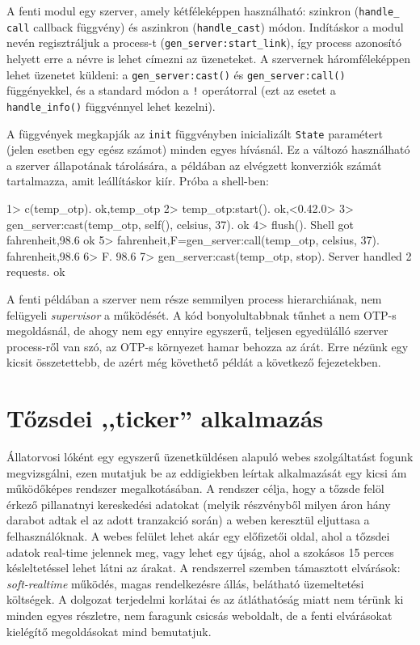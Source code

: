 \documentclass[12pt, a4paper, oneside]{book}
\begin{document}
A fenti modul egy szerver, amely kétféleképpen használható: szinkron
(\texttt{handle\_ call} callback függvény) és aszinkron (\texttt{handle\_cast})
módon. Indításkor a modul nevén regisztráljuk a process-t
(\texttt{gen\_server:start\_link}), így process azonosító helyett erre a névre
is lehet címezni az üzeneteket. A szervernek háromféleképpen lehet üzenetet
küldeni: a \texttt{gen\_server:cast()} és \texttt{gen\_server:call()}
függényekkel, és a standard módon a \texttt{!} operátorral (ezt az esetet a
\texttt{handle\_info()} függvénnyel lehet kezelni).

A függvények megkapják az \texttt{init} függvényben inicializált \texttt{State}
paramétert (jelen esetben egy egész számot) minden egyes hívásnál. Ez a változó
használható a szerver állapotának tárolására, a példában az elvégzett
konverziók számát tartalmazza, amit leállításkor kiír. Próba a shell-ben:

\begin{code}{}{}
1> c(temp_otp).
{ok,temp_otp}
2> temp_otp:start().
{ok,<0.42.0>}
3> gen_server:cast(temp_otp, {self(), celsius, 37}).
ok
4> flush().
Shell got {fahrenheit,98.6}
ok
5> {fahrenheit,F}=gen_server:call(temp_otp, {celsius, 37}).
{fahrenheit,98.6}
6> F.
98.6
7> gen_server:cast(temp_otp, stop).                           
Server handled 2 requests.
ok
\end{code}

A fenti példában a szerver nem része semmilyen process hierarchiának, nem
felügyeli \emph{supervisor} a működését. A kód bonyolultabbnak tűnhet a nem OTP-s
megoldásnál, de ahogy nem egy ennyire egyszerű, teljesen egyedülálló szerver
process-ről van szó, az OTP-s környezet hamar behozza az árát. Erre nézünk egy
kicsit összetettebb, de azért még követhető példát a következő fejezetekben.

\chapter{Tőzsdei ,,ticker'' alkalmazás} Állatorvosi lóként egy egyszerű
üzenetküldésen alapuló webes szolgáltatást fogunk megvizsgálni, ezen mutatjuk
be az eddigiekben leírtak alkalmazását egy kicsi ám működőképes rendszer
megalkotásában. A rendszer célja, hogy a tőzsde felöl érkező pillanatnyi
kereskedési adatokat (melyik részvényből milyen áron hány darabot adtak el az
adott tranzakció során) a weben keresztül eljuttasa a felhasználóknak. A webes
felület lehet akár egy előfizetői oldal, ahol a tőzsdei adatok real-time
jelennek meg, vagy lehet egy újság, ahol a szokásos 15 perces késleltetéssel
lehet látni az árakat. A rendszerrel szemben támasztott elvárások:
\emph{soft-realtime} működés, magas rendelkezésre állás, belátható üzemeltetési
költségek. A dolgozat terjedelmi korlátai és az átláthatóság miatt nem térünk
ki minden egyes részletre, nem faragunk csicsás weboldalt, de a fenti
elvárásokat kielégítő megoldásokat mind bemutatjuk.
\end{document}
